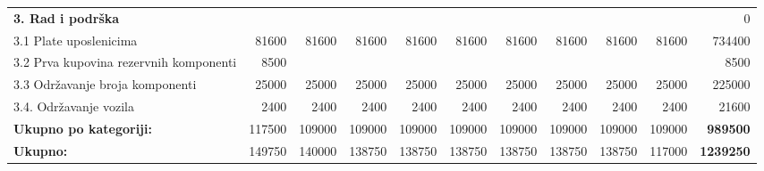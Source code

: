 \documentclass[12pt]{article}
\begin{document}
\begin{landscape}
\begin{table}[htbp]
\begin{tabular}{lrrrrrrrrrr}
    \midrule
    \textbf{3. Rad i podrška} &       &       &       &       &       &       &       &       &       & 0 \\
    3.1 Plate uposlenicima & 81600 & 81600 & 81600 & 81600 & 81600 & 81600 & 81600 & 81600 & 81600 & 734400 \\
    \multicolumn{1}{p{14.715em}}{3.2 Prva kupovina rezervnih\newline{} komponenti} & 8500  &       &       &       &       &       &       &       &       & 8500 \\
    3.3 Održavanje broja komponenti & 25000 & 25000 & 25000 & 25000 & 25000 & 25000 & 25000 & 25000 & 25000 & 225000 \\
    3.4. Održavanje vozila & 2400  & 2400  & 2400  & 2400  & 2400  & 2400  & 2400  & 2400  & 2400  & 21600 \\
    \midrule
    \textbf{Ukupno po kategoriji:} & 117500 & 109000 & 109000 & 109000 & 109000 & 109000 & 109000 & 109000 & 109000 & \textbf{989500} \\
    \midrule
    \textbf{Ukupno:} & 149750 & 140000 & 138750 & 138750 & 138750 & 138750 & 138750 & 138750 & 117000 & \textbf{1239250} \\

    \bottomrule
    \end{tabular}%
  \label{rj2_50}%
\end{table}%

\end{landscape}
\end{document}
